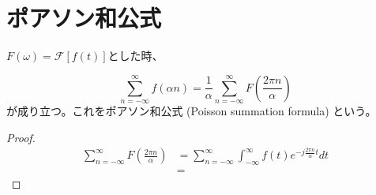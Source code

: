 \documentclass[]{jlreq}
\theoremstyle{definition}
\begin{document}
\section{ポアソン和公式}

$F(\omega) = \mathcal{F}[f(t)]$とした時、

\begin{equation}
  \sum_{n=-\infty}^{\infty} f(\alpha n) = \frac{1}{\alpha} \sum_{n=-\infty}^{\infty} F\left( \frac{2 \pi n}{\alpha}\right)
\end{equation}
%
が成り立つ。これをポアソン和公式 (Poisson summation formula) という。
%
\begin{proof}
  \begin{align}
    \sum_{n=-\infty}^{\infty} F\left( \frac{2 \pi n}{\alpha}\right) 
      &= \sum_{n=-\infty}^{\infty} \int_{-\infty}^{\infty} f(t) e^{-j \frac{2\pi n}{\alpha} t} dt \\
      &= 
  \end{align}
\end{proof}
%
\end{document}

